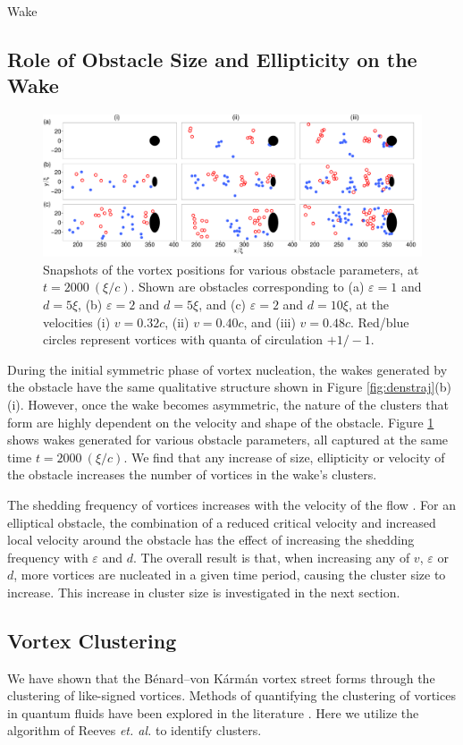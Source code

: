 \begin{chapter}{\label{cha:wake}Wake}
\subsection{Role of Obstacle Size and Ellipticity on the Wake}
\label{sec:ellipt}
\begin{figure}
\includegraphics[width=\textwidth]{wake/figure5}
\caption{\label{fig:3x3grid}Snapshots of the vortex positions for various obstacle parameters, at $t=2000~(\xi/c)$. Shown are obstacles corresponding to (a) $\varepsilon=1$ and $d=5\xi$, (b) $\varepsilon=2$ and $d=5\xi$, and (c) $\varepsilon=2$ and $d=10\xi$, at the velocities (i) $v=0.32c$, (ii) $v=0.40c$, and (iii) $v=0.48c$.  Red/blue circles represent vortices with quanta of circulation $+1/-1$.}
\end{figure}
During the initial symmetric phase of vortex nucleation, the wakes generated by the obstacle have the same qualitative structure shown in Figure \ref{fig:denstraj}(b) (i).  However, once the wake becomes asymmetric, the nature of the clusters that form are highly dependent on the velocity and shape of the obstacle. Figure \ref{fig:3x3grid} shows wakes generated for various obstacle parameters, all captured at the same time $t=2000~(\xi/c)$. We find that any increase of size, ellipticity or velocity of the obstacle increases the number of vortices in the wake's clusters.


The shedding frequency of vortices increases with the velocity of the flow \cite{jma99}. For an elliptical obstacle, the combination of a reduced critical velocity and increased local velocity around the obstacle has the effect of increasing the shedding frequency with $\varepsilon$ and $d$. The overall result is that, when increasing any of $v$, $\varepsilon$ or $d$, more vortices are nucleated in a given time period, causing the cluster size to increase. This increase in cluster size is investigated in the next section.

\subsection{Vortex Clustering}
We have shown that the B\'enard--von K\'arm\'an vortex street forms through the clustering of like-signed vortices. Methods of quantifying the clustering of vortices in quantum fluids have been explored in the literature \cite{white12,reeves_billam_13,bagg12}. Here we utilize the algorithm of Reeves \emph{et. al.} \cite{reeves_billam_13} to identify clusters.


\end{chapter}
